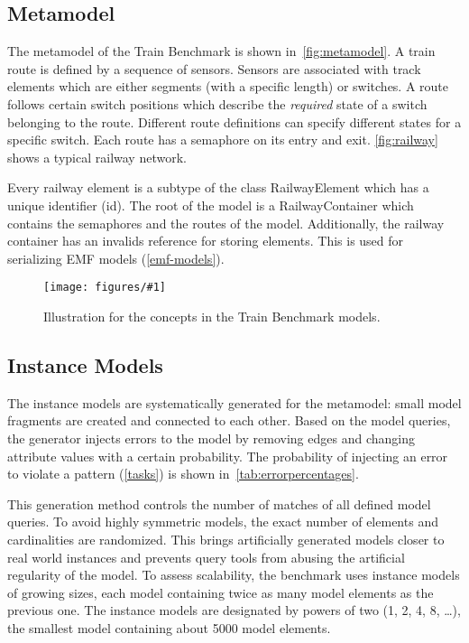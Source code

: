 \documentclass[submission,copyright,creativecommons]{eptcs}
\newcommand{\tb}{Train Benchmark\xspace}
\newcommand{\figref}[1]{\autoref{fig:#1}}
\newcommand{\ttcfig}[2]{
\begin{figure}[htb] 
	\centering
	\texttt{[image: figures/\#1]}
	\caption{#2.}
	\label{fig:#1}
\end{figure}}
\begin{document}
\subsection{Metamodel}

The metamodel of the \tb is shown in~\figref{metamodel}. A train \textsf{route} is defined by a sequence of \textsf{sensor}s. Sensors are associated with \textsf{track elements} which are either \textsf{segment}s (with a specific length) or \textsf{switch}es. A route follows certain \textsf{switch positions} which describe the \emph{required} state of a switch belonging to the route. Different route definitions can specify different states for a specific switch. Each route has a \textsf{semaphore} on its entry and exit. \figref{railway} shows a typical railway network.

Every railway element is a subtype of the class \textsf{RailwayElement} which has a unique identifier (\textsf{id}). The root of the model is a \textsf{RailwayContainer} which contains the semaphores and the routes of the model. Additionally, the railway container has an \textsf{invalids} reference for storing elements. This is used for serializing EMF models (\autoref{emf-models}). 

\ttcfig{railway}{Illustration for the concepts in the \tb models}

\subsection{Instance Models}
\label{instancemodels}

The instance models are systematically generated for the metamodel: small model fragments are created and connected to each other. Based on the model queries, the generator injects errors to the model by removing edges and changing attribute values with a certain probability. The probability of injecting an error to violate a pattern (\autoref{tasks}) is shown in~\autoref{tab:errorpercentages}.

This generation method controls the number of matches of all defined model queries. To avoid highly symmetric models, the exact number of elements and cardinalities are randomized. This brings artificially generated models closer to real world instances and prevents query tools from abusing the artificial regularity of the model.  To assess scalability, the benchmark uses instance models of growing sizes, each model containing twice as many model elements as the previous one. The instance models are designated by powers of two (1, 2, 4, 8, \ldots), the smallest model containing about 5000 model elements. 
\end{document}
